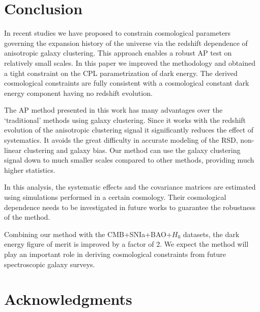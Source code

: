 \documentclass[iop]{emulateapj}
\begin{document}
\section{Conclusion}

In recent studies we have proposed to constrain cosmological parameters 
governing the expansion history of the universe via 
the redshift dependence of anisotropic galaxy clustering\cite{Li2016}.
This approach enables a robust AP test on relatively small scales.
In this paper we improved the methodology and obtained a tight constraint 
on the CPL parametrization of dark energy.
The derived cosmological constraints are fully consistent with a cosmological constant 
dark energy component having no redshift evolution.


The AP method presented in this work has many advantages over the 
`traditional' methods using galaxy clustering.
Since it works with the redshift evolution of the anisotropic clustering signal it significantly reduces the effect of systematics. 
It avoids the great difficulty in accurate modeling of the RSD, non-linear clustering and galaxy bias.
Our method can use the galaxy clustering signal down to
much smaller scales compared to other methods,
providing much higher statistics.


In this analysis, the systematic effects and the covariance matrices are estimated using simulations performed in a certain cosmology.
Their cosmological dependence needs to be investigated in future works to guarantee the robustness of the method.


Combining our method with the CMB+SNIa+BAO+$H_0$ datasets,
the dark energy figure of merit is improved by a factor of 2.
We expect the method will play an important role in deriving cosmological constraints from future spectroscopic galaxy surveys.



\section*{Acknowledgments}
\end{document}
